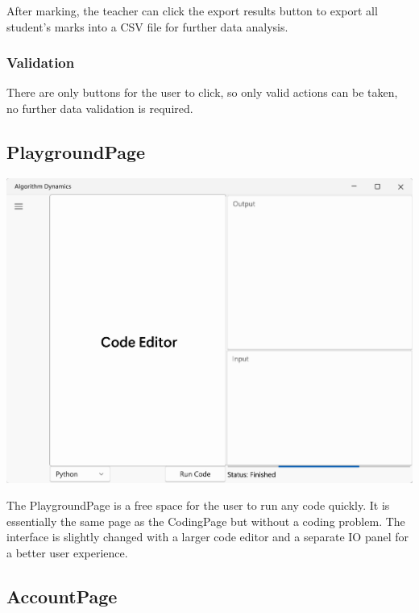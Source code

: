 \documentclass[a4paper]{report}
\begin{document}
After marking, the teacher can click the export results button to export all student's marks into a CSV file for further data analysis.

\subsubsection{Validation}

There are only buttons for the user to click, so only valid actions can be taken, no further data validation is required.

\subsection{PlaygroundPage}

\includegraphics[width=\textwidth, height=\textheight, keepaspectratio]{PlaygroundPage-design}

The PlaygroundPage is a free space for the user to run any code quickly. It is essentially the same page as the CodingPage but without a coding problem. The interface is slightly changed with a larger code editor and a separate IO panel for a better user experience.

\subsection{AccountPage}
\end{document}
